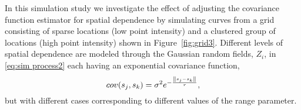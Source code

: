 %
%
%

In this simulation study we investigate the effect of adjusting the covariance function estimator for spatial dependence by simulating curves from a grid consisting of sparse locations (low point intensity) and a clustered group of locations (high point intensity) shown in Figure~\ref{fig:grid3}. Different levels of spatial dependence are modeled through the Gaussian random fields, $Z_i$, in \eqref{eq:sim process2} each having an exponential covariance function, 
\begin{equation}
	cov(s_j, s_k) = \sigma^2e^{-\frac{\left\|s_j - s_k\right\|}{r}},\label{eq:exp cov}
\end{equation}
but with different cases corresponding to different values of the range parameter. 


